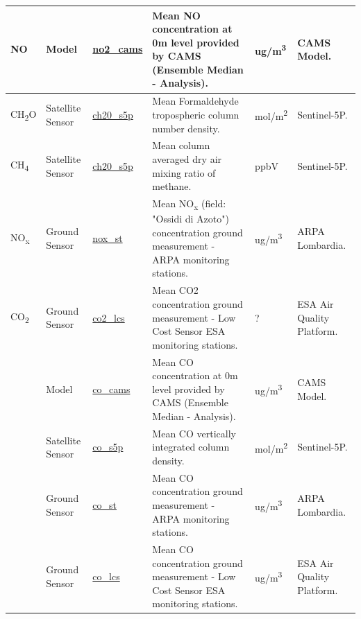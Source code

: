 \begin{center}
\begin{longtable}{ |p{2.3cm}|p{1.5cm}|p{2.3cm}|p{4cm}|p{1.2cm}|p{2.3cm}| }
\multirow{1}{4em}{NO} & Model  & \underline{no2\_cams} & Mean NO concentration at 0m level provided by CAMS  (Ensemble Median - Analysis). \par& ug/m\textsuperscript{3} & CAMS Model.\\  \hline

\multirow{1}{4em}{CH\textsubscript{2}O} & Satellite \newline Sensor  & \underline{ch20\_s5p} & Mean Formaldehyde tropospheric column number density. \par& mol/m\textsuperscript{2} & Sentinel-5P.\\  \hline

\multirow{1}{4em}{CH\textsubscript{4}} & Satellite \newline Sensor  & \underline{ch20\_s5p} & Mean column averaged dry air mixing ratio of methane. \par& ppbV & Sentinel-5P.\\  \hline

\multirow{1}{4em}{NO\textsubscript{x}} & Ground \newline Sensor & \underline{nox\_st} &  Mean NO\textsubscript{x} (field: "Ossidi di Azoto") concentration ground measurement - ARPA monitoring stations.\par  & ug/m\textsuperscript{3} & ARPA \newline Lombardia.\\ \hline

\multirow{1}{4em}{CO\textsubscript{2}} & Ground \newline Sensor & \underline{co2\_lcs} &  Mean CO2 concentration ground measurement - Low Cost Sensor ESA monitoring stations. \par & ? & ESA Air Quality Platform.\\ \hline
\pagebreak
\hline
\multirow{4}{4em}{CO} & Model  & \underline{co\_cams} & Mean CO concentration at 0m level provided by CAMS  (Ensemble Median - Analysis).\par & ug/m\textsuperscript{3} & CAMS Model.\\ 
& Satellite \newline Sensor  & \underline{co\_s5p} &  Mean CO vertically integrated column density.\par & mol/m\textsuperscript{2} & Sentinel-5P.\\ 
& Ground \newline Sensor & \underline{co\_st} &  Mean CO concentration ground measurement - ARPA monitoring stations. \par & ug/m\textsuperscript{3} & ARPA \newline Lombardia.\\ 
& Ground \newline Sensor & \underline{co\_lcs} &  Mean CO concentration ground measurement - Low Cost Sensor ESA monitoring stations. \par & ug/m\textsuperscript{3} & ESA Air Quality Platform.\\ \hline


\end{longtable}
\end{center}
